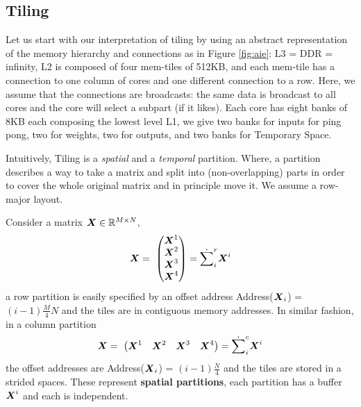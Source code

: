 \documentclass[acmsmall]{acmart}
\begin{document}
\subsection{Tiling}
\label{sec:tiling}

Let us start with our interpretation of tiling by using an abstract
representation of the memory hierarchy and connections as in Figure
\ref{fig:aie}: L3 = DDR = infinity, L2 is composed of four mem-tiles
of 512KB, and each mem-tile has a connection to one column of cores
and one different connection to a row. Here, we assume that the
connections are broadcasts: the same data is broadcast to all cores
and the core will select a subpart (if it likes). Each core has eight
banks of 8KB each composing the lowest level L1, we give two banks for
inputs for ping pong, two for weights, two for outputs, and two banks
for Temporary Space. 

Intuitively, Tiling is a {\em spatial} and a {\em temporal}
partition. Where, a partition describes a way to take a matrix and
split into (non-overlapping) parts in order to cover the whole
original matrix and in principle move it. We assume a row-major
layout.

\begin{definition}
   Consider a matrix ${\boldsymbol X} \in
  \mathbb{R}^{M\times N}$, 
  \begin{equation}
    {\boldsymbol X}  = \
    \begin{pmatrix}
      {\boldsymbol X}^1  \\
      {\boldsymbol X}^2  \\
      {\boldsymbol X}^3  \\
      {\boldsymbol X}^4  \\
    \end{pmatrix} = \dot\sum_i^r {\boldsymbol X}^i
  \end{equation}
  a row partition is easily specified by an offset address
  Address(${\boldsymbol X}_i$) = $(i-1)\frac{M}{4}N$ and the tiles are in
  contiguous memory addresses. In similar fashion, in a column
  partition
  \begin{equation}
    {\boldsymbol X}  = \
    \begin{pmatrix}
      {\boldsymbol X}^1  & {\boldsymbol X}^2  &  {\boldsymbol X}^3  &   {\boldsymbol X}^4  \\
    \end{pmatrix} = \dot\sum_i^c {\boldsymbol X}^i
  \end{equation}
  the offset addresses are Address(${\boldsymbol X}_i$) = $(i-1)\frac{N}{4}$
  and the tiles are stored in a strided spaces.  These represent {\bf
    spatial partitions}, each partition has a buffer ${\boldsymbol X}^i$ and
  each is independent.
\end{definition}
\end{document}
